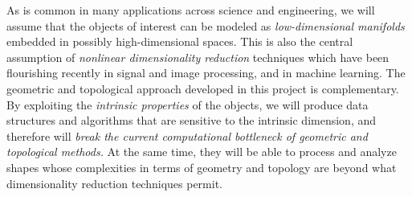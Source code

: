 As is common in many applications across science and engineering, we
will assume that the objects of interest can be modeled as {\em
  low-dimensional manifolds} embedded in possibly high-dimensional
spaces. This is also the central assumption of  {\em nonlinear dimensionality reduction}  techniques which have been flourishing recently in  signal and image processing, and in machine learning. The geometric and topological approach developed in this project is complementary.
By exploiting the {\em intrinsic properties} of the objects,
we will produce data structures and algorithms that are sensitive to the intrinsic dimension, and
therefore will {\em break the current computational
bottleneck of geometric and topological methods.}  At the same time, they will be able to process and analyze shapes whose complexities in terms of geometry and topology are beyond what dimensionality reduction techniques permit.







